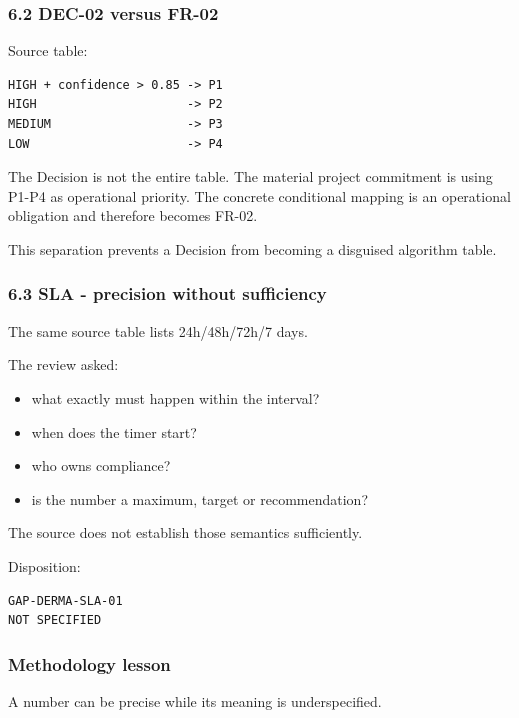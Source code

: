 \documentclass[11pt,a4paper]{article}
\providecommand{\tightlist}{\setlength{\itemsep}{0pt}\setlength{\parskip}{0pt}}
\begin{document}
\subsubsection{6.2 DEC-02 versus FR-02}\label{62-dec-02-versus-fr-02}

Source table:

\begin{verbatim}
HIGH + confidence > 0.85 -> P1
HIGH                     -> P2
MEDIUM                   -> P3
LOW                      -> P4
\end{verbatim}

The Decision is not the entire table. The material project commitment is
using P1-P4 as operational priority. The concrete conditional mapping is
an operational obligation and therefore becomes FR-02.

This separation prevents a Decision from becoming a disguised algorithm
table.

\subsubsection{6.3 SLA - precision without
sufficiency}\label{63-sla---precision-without-sufficiency}

The same source table lists 24h/48h/72h/7 days.

The review asked:

\begin{itemize}
\tightlist
\item
  what exactly must happen within the interval?
\item
  when does the timer start?
\item
  who owns compliance?
\item
  is the number a maximum, target or recommendation?
\end{itemize}

The source does not establish those semantics sufficiently.

Disposition:

\begin{verbatim}
GAP-DERMA-SLA-01
NOT SPECIFIED
\end{verbatim}

\subsubsection{Methodology lesson}\label{methodology-lesson-2}

A number can be precise while its meaning is underspecified.
\end{document}
